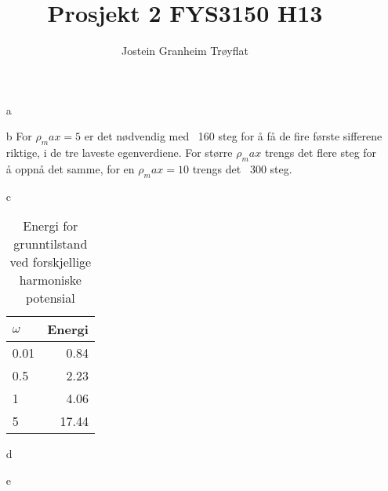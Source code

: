 \documentclass[a4paper, 12pt]{article}
\title{Prosjekt 2 FYS3150 H13}
\date{}
\author{Jostein Granheim Trøyflat}
\begin{document}
\maketitle

\begin{itemize}

\item[a]

\item[b]
For $\rho_max = 5$ er det nødvendig med ~160 steg for å få de fire første sifferene riktige, i de tre laveste egenverdiene. For større $\rho_max$ trengs det flere steg for å oppnå det samme, for en $\rho_max = 10$ trengs det ~300 steg. 
\item[c]

\begin{table}[h]
\begin{center}
	\caption{Energi for grunntilstand ved forskjellige harmoniske potensial}
	\label{tab:relativfeil}
	\begin{tabular}{| l | r |}
		\hline
		$\omega$ & Energi \\ \hline
		0.01 & 0.84 \\ \hline
		0.5 & 2.23 \\ \hline
		1 & 4.06 \\ \hline
		5 & 17.44 \\ \hline
	\end{tabular}
	\end{center}
\end{table}

\item[d]

\item[e]

\end{itemize}
\end{document}
